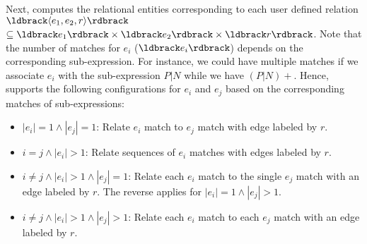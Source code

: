 Next, \framework computes the relational entities corresponding to each user defined relation $\ldbrack \langle e_1,e_2,r\rangle \rdbrack$
$\subseteq \ldbrack e_1 \rdbrack \times \ldbrack e_2 \rdbrack \times \ldbrack r \rdbrack$.
Note that the number of matches for $e_i$ ($\ldbrack e_i \rdbrack$) depends on the corresponding sub-expression.
For instance, we could have multiple matches if we associate $e_i$ with the sub-expression $P|N$ while we have $(P|N)+$.
Hence, \framework supports the following configurations for $e_i$ and $e_j$ based on the corresponding matches of sub-expressions:
\begin{itemize}
\item $\left\vert{e_i}\right\vert=1\wedge\left\vert{e_j}\right\vert=1$: Relate $e_i$ match to $e_j$ match with edge labeled by $r$.
\item $i=j\wedge\left\vert{e_i}\right\vert>1$: Relate sequences of $e_i$ matches with edges labeled by $r$.
\item $i\neq j\wedge\left\vert{e_i}\right\vert>1\wedge\left\vert{e_j}\right\vert=1$: Relate each $e_i$ match to the single $e_j$ match with an edge labeled by $r$. The reverse applies for $\left\vert{e_i}\right\vert=1\wedge\left\vert{e_j}\right\vert>1$.
\item $i\neq j\wedge\left\vert{e_i}\right\vert>1\wedge\left\vert{e_j}\right\vert>1$: Relate each $e_i$ match to each $e_j$ match with an edge labeled by $r$.
\end{itemize}




